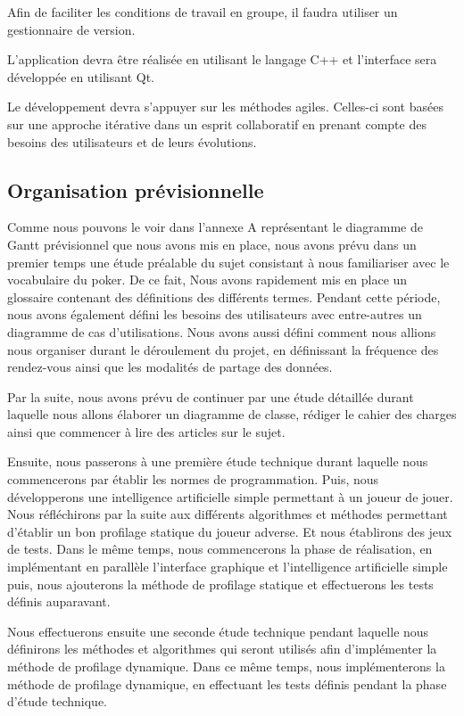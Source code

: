 \documentclass{report}
\begin{document}
\hspace{0.5cm}Afin de faciliter les conditions de travail en groupe, il faudra utiliser un gestionnaire de version.\par
L'application devra être réalisée en utilisant le langage C++ et l'interface sera développée en utilisant Qt.\par
Le développement devra s'appuyer sur les méthodes agiles. Celles-ci sont basées sur une approche itérative dans un esprit collaboratif en prenant compte des besoins des utilisateurs et de leurs évolutions.\par

\subsection{Organisation prévisionnelle}

\hspace{0.5cm}Comme nous pouvons le voir dans l'annexe A représentant le diagramme de Gantt prévisionnel que nous avons mis en place, nous avons prévu dans un premier temps une étude préalable du sujet consistant à nous familiariser avec le vocabulaire du poker. De ce fait, Nous avons rapidement mis en place un glossaire contenant des définitions des différents termes. Pendant cette période, nous avons également défini les besoins des utilisateurs avec entre-autres un diagramme de cas d'utilisations. Nous avons aussi défini comment nous allions nous organiser durant le déroulement du projet, en définissant la fréquence des rendez-vous ainsi que les modalités de partage des données.\par

Par la suite, nous avons prévu de continuer par une étude détaillée durant laquelle nous allons élaborer un diagramme de classe, rédiger le cahier des charges ainsi que commencer à lire des articles sur le sujet.\par

Ensuite, nous passerons à une première étude technique durant laquelle nous commencerons par établir les normes de programmation. Puis, nous développerons une intelligence artificielle simple permettant à un joueur de jouer. Nous réfléchirons par la suite aux différents algorithmes et méthodes permettant d'établir un bon profilage statique du joueur adverse. Et nous établirons des jeux de tests. Dans le même temps, nous commencerons la phase de réalisation, en implémentant en parallèle l'interface graphique et l'intelligence artificielle simple puis, nous ajouterons la méthode de profilage statique et effectuerons les tests définis auparavant.\par
Nous effectuerons ensuite une seconde étude technique pendant laquelle nous définirons les méthodes et algorithmes qui seront utilisés afin d'implémenter la méthode de profilage dynamique. Dans ce même temps, nous implémenterons la méthode de profilage dynamique, en effectuant les tests définis pendant la phase d'étude technique.\par
\end{document}
